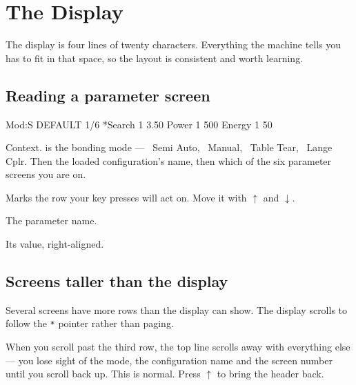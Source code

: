 \chapter{The Display}
\label{ch:display}

The display is four lines of twenty characters. Everything the machine tells
you has to fit in that space, so the layout is consistent and worth learning.

\section{Reading a parameter screen}

\begin{lcdscreen}
\begin{lcdverb}
Mod:S DEFAULT   1/6
*Search 1      3.50
 Power 1        500
 Energy 1        50
\end{lcdverb}
\end{lcdscreen}

\begin{description}[leftmargin=!,labelwidth=30mm,style=nextline]
\item[Top line] Context.  is the bonding mode ---
  ~Semi Auto, ~Manual, ~Table Tear,
  ~Lange Cplr. Then the loaded configuration's name, then which of
  the six parameter screens you are on.
\item[The \texttt{*}] Marks the row your key presses will act on. Move it with
  $\uparrow$ and $\downarrow$.
\item[Left of each row] The parameter name.
\item[Right of each row] Its value, right-aligned.
\end{description}

\section{Screens taller than the display}

Several screens have more rows than the display can show. The display scrolls
to follow the \texttt{*} pointer rather than paging.

\begin{wbnote}
When you scroll past the third row, the top line scrolls away with everything
else --- you lose sight of the mode, the configuration name and the screen
number until you scroll back up. This is normal. Press $\uparrow$ to bring the
header back.
\end{wbnote}

